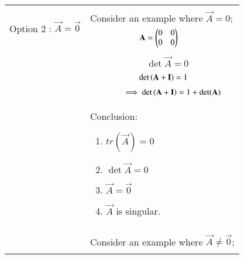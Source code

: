 \documentclass[journal,12pt]{IEEEtran}
\begin{document}
\begin{longtable}{|p{5cm}|p{13cm}|}
	\hline
	\multirow{3}{*}{Option 2 : $\vec{A}=\vec{0}$} & \\
	& Consider an example where $\vec{A}=0;$\\
	& $\qquad\qquad\qquad\mathbf{A}= \begin{pmatrix}0&0\\0&0\end{pmatrix}$\\
	&\\
    & $\qquad\qquad\qquad\det\vec{A}=0$\\
    &\\
    & $\qquad\qquad\qquad\det\left(\mathbf{A}+\mathbf{I}\right)=1$\\
    &\\
    & $\qquad\qquad\implies\det\left(\mathbf{A}+\mathbf{I}\right)=1+\det(\mathbf{A}) $\\
   
    & Conclusion: {\begin{enumerate}
	\item $tr(\vec{A})=0$
	\item $\det{\vec{A}}=0$
	\item $\vec{A}=\vec{0}$
	\item $\vec{A}$ is singular.\end{enumerate}}\\
	&\\
	& Consider an example where $\vec{A}\neq \vec{0}$;\\
	&\\
	

\end{longtable}
\end{document}
